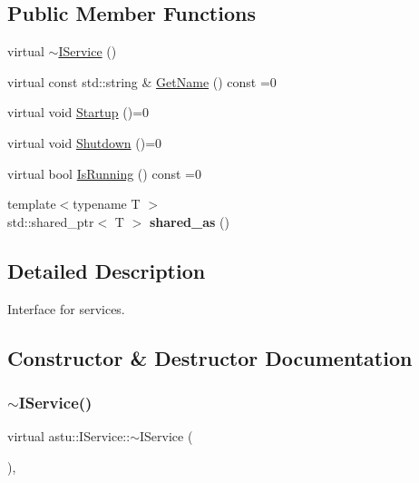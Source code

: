 \subsection*{Public Member Functions}
\begin{DoxyCompactItemize}
\item 
virtual \hyperlink{classastu_1_1IService_abf42fedf905da617ad881d3fd28a9d7e}{$\sim$\+I\+Service} ()
\item 
virtual const std\+::string \& \hyperlink{classastu_1_1IService_a7bfb508c07816c701ceaa72928213380}{Get\+Name} () const =0
\item 
virtual void \hyperlink{classastu_1_1IService_a7a09e485d116659f174aca9a8494fa55}{Startup} ()=0
\item 
virtual void \hyperlink{classastu_1_1IService_a67643385e7cc17c31e0b3b49672b5856}{Shutdown} ()=0
\item 
virtual bool \hyperlink{classastu_1_1IService_ab69225f6a613c8829c45d23158fba775}{Is\+Running} () const =0
\item 
\mbox{\label{classastu_1_1IService_a32626c25d07a29697a6f965d7861c03d}} 
{\footnotesize template$<$typename T $>$ }\\std\+::shared\+\_\+ptr$<$ T $>$ {\bfseries shared\+\_\+as} ()
\end{DoxyCompactItemize}


\subsection{Detailed Description}
Interface for services. 

\subsection{Constructor \& Destructor Documentation}
\mbox{\label{classastu_1_1IService_abf42fedf905da617ad881d3fd28a9d7e}} 
\subsubsection{\texorpdfstring{$\sim$\+I\+Service()}{~IService()}}
{\footnotesize\ttfamily virtual astu\+::\+I\+Service\+::$\sim$\+I\+Service (\begin{DoxyParamCaption}{ }\end{DoxyParamCaption})\hspace{0.3cm}{\ttfamily [inline]}, {\ttfamily [virtual]}}

